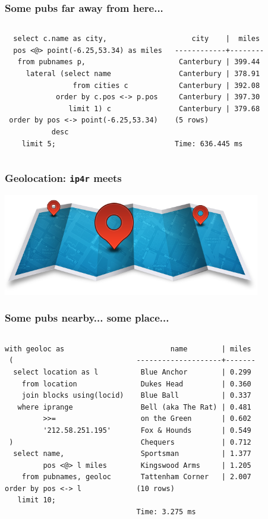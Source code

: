 \documentclass{beamer}
\begin{document}
\begin{frame}[fragile]
  \frametitle{Some pubs far away from here...}

\begin{columns}
\begin{verbatim}
  select c.name as city,
  pos <@> point(-6.25,53.34) as miles
   from pubnames p,
     lateral (select name
                from cities c
            order by c.pos <-> p.pos
               limit 1) c
 order by pos <-> point(-6.25,53.34)
           desc
    limit 5;
\end{verbatim}  
\begin{verbatim}
    city    |  miles       
------------+--------
 Canterbury | 399.44
 Canterbury | 378.91
 Canterbury | 392.08
 Canterbury | 397.30
 Canterbury | 379.68
(5 rows)

Time: 636.445 ms
\end{verbatim}  
\end{columns}
\end{frame}

\begin{frame}[fragile]
  \frametitle{Geolocation: \texttt{ip4r} meets }

\begin{center}
  \includegraphics[height=12em]{geolocation.png}
\end{center}
\end{frame}

\begin{frame}[fragile]
  \frametitle{Some pubs nearby... some place...}

\begin{columns}
\begin{verbatim}
with geoloc as
 (
  select location as l
    from location
    join blocks using(locid)
   where iprange
         >>=
         '212.58.251.195'
 )
  select name,
         pos <@> l miles
    from pubnames, geoloc
order by pos <-> l
   limit 10;
\end{verbatim}  
\begin{verbatim}
        name        | miles 
--------------------+-------
 Blue Anchor        | 0.299
 Dukes Head         | 0.360
 Blue Ball          | 0.337
 Bell (aka The Rat) | 0.481
 on the Green       | 0.602
 Fox & Hounds       | 0.549
 Chequers           | 0.712
 Sportsman          | 1.377
 Kingswood Arms     | 1.205
 Tattenham Corner   | 2.007
(10 rows)

Time: 3.275 ms
\end{verbatim}  
\end{columns}
\end{frame}
\end{document}
